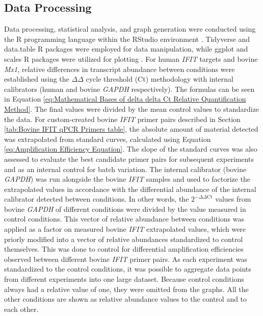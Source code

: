 \subsection{Data Processing} \label{subsec:Data Processing}
Data processing, statistical analysis, and graph generation were conducted using the R programming language \cite{RCoreTeam2022R:Computing} within the RStudio environment \cite{RStudioTeam2022RStudio:RStudio}. Tidyverse and data.table R packages \cite{Wickham2019WelcomeTidyverse, Dowle2022Data.table:data.frame} were employed for data manipulation, while ggplot and scales R packages were utilized for plotting \cite{Wickham2019WelcomeTidyverse, Wickham2022Scales:Visualization}. For human \textit{IFIT} targets and bovine \textit{Mx1}, relative differences in transcript abundance between conditions were established using the \(\Delta\)\(\Delta\) cycle threshold (Ct) methodology with internal calibrators (human and bovine \textit{GAPDH} respectively). The formulas can be seen in Equation \ref{eq:Mathematical Bases of delta delta Ct Relative Quantification Method}. The final values were divided by the mean control values to standardize the data. For custom-created bovine \textit{IFIT} primer pairs described in Section \ref{tab:Bovine IFIT qPCR Primers table}, the absolute amount of material detected was extrapolated from standard curves, calculated using Equation \ref{eq:Amplification Efficiency Equation}. The slope of the standard curves was also assessed to evaluate the best candidate primer pairs for subsequent experiments and as an internal control for batch variation. The internal calibrator (bovine \textit{GAPDH}) was run alongside the bovine \textit{IFIT} samples and used to factorize the extrapolated values in accordance with the differential abundance of the internal calibrator detected between conditions. In other words, the \(2^{-\Delta\Delta \mbox{Ct}}\) values from bovine \textit{GAPDH} of different conditions were divided by the value measured in control conditions. This vector of relative abundance between conditions was applied as a factor on measured bovine \textit{IFIT} extrapolated values, which were priorly modified into a vector of relative abundances standardized to control themselves. This was done to control for differential amplification efficiencies observed between different bovine \textit{IFIT} primer pairs. As each experiment was standardized to the control conditions, it was possible to aggregate data points from different experiments into one large dataset. Because control conditions always had a relative value of one, they were omitted from the graphs. All the other conditions are shown as relative abundance values to the control and to each other.

